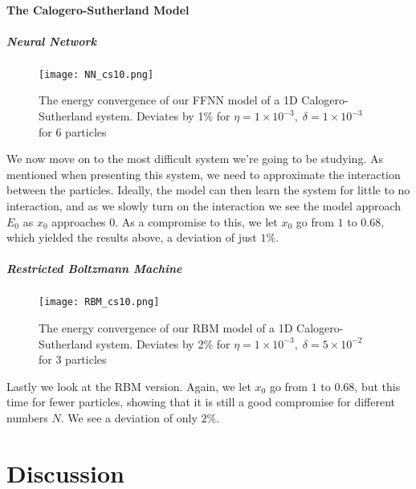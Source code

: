 \documentclass[12pt]{article}
\begin{document}
{\subsection{The Calogero-Sutherland Model}
\subsubsection*{Neural Network}
\begin{figure}[ht!]
    \centering
    \texttt{[image: NN\_cs10.png]}
    \caption{The energy convergence of our FFNN model of a 1D Calogero-Sutherland system. Deviates by 1\% for $\eta = 1 \times 10^{-3}, \; \delta = 1 \times 10^{-3}$ for 6 particles}
    \label{fig:NNcs}
\end{figure}
We now move on to the most difficult system we're going to be studying. As mentioned when presenting this system, we need to approximate the interaction between the particles. Ideally, the model can then learn the system for little to no interaction, and as we slowly turn on the interaction we see the model approach $E_0$ as $x_0$ approaches $0$. As a compromise to this, we let $x_0$ go from $1$ to $0.68$, which yielded the results above, a deviation of just $1\%$.
\newpage
\subsubsection*{Restricted Boltzmann Machine}
\begin{figure}[ht!]
    \centering
    \texttt{[image: RBM\_cs10.png]}
    \caption{The energy convergence of our RBM model of a 1D Calogero-Sutherland system. Deviates by 2\% for $\eta = 1 \times 10^{-3}, \; \delta = 5 \times 10^{-2}$ for 3 particles}
    \label{fig:RBMcs}
\end{figure}
Lastly we look at the RBM version. Again, we let $x_0$ go from $1$ to $0.68$, but this time for fewer particles, showing that it is still a good compromise for different numbers $N$. We see a deviation of only $2\%$.
\newpage
~\newpage
\part{Discussion}
}
\end{document}
